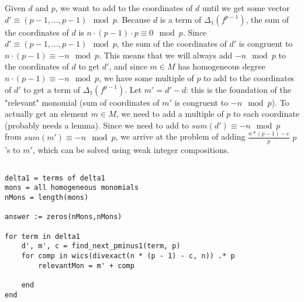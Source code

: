 Given $d$ and $p$, we want to add to the coordinates of $d$ until we get some vector $d' \equiv (p - 1, \dots, p - 1) \mod p$. Because $d$ is a term of $\Delta_{1}(f ^ {p - 1})$, the sum of the coordinates of $d$ is $n \cdot (p - 1) \cdot p \equiv 0 \mod p$. Since $d' \equiv (p - 1, \dots, p - 1) \mod p$, the sum of the coordinates of $d'$ is congruent to $n \cdot (p - 1) \equiv -n \mod p$. This means that we will always add $-n \mod p$ to the coordinates of $d$ to get $d'$, and since $m \in M$ has homogeneous degree $n \cdot (p - 1) \equiv -n \mod p$, we have some multiple of $p$ to add to the coordinates of $d'$ to get a term of $\Delta_{1}(f ^ {p - 1})$. Let $m' = d' - d$: this is the foundation of the "relevant" monomial (sum of coordinates of $m'$ is congruent to $-n \mod p$). To actually get an element $m \in M$, we need to add a multiple of $p$ to each coordinate (probably needs a lemma). Since we need to add to $sum(d') \equiv -n \mod p$ from $sum(m') \equiv -n \mod p$, we arrive at the problem of adding $\frac{n * (p - 1) - c}{p}$ $p$'s to $m'$, which can be solved using weak integer compositions.

\begin{alg}
\begin{lstlisting}

delta1 = terms of delta1
mons = all homogeneous monomials
nMons = length(mons)

answer := zeros(nMons,nMons)

for term in delta1
    d', m', c = find_next_pminus1(term, p)
    for comp in wics(divexact(n * (p - 1) - c, n)) .* p
        relevantMon = m' + comp
        
    end
end
\end{lstlisting}
\end{alg}







